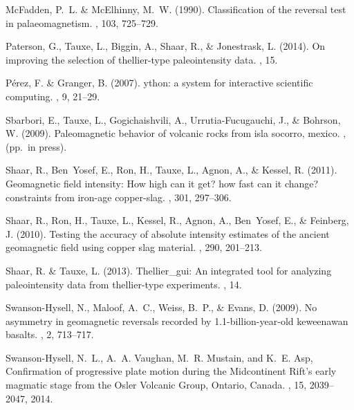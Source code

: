 \documentclass[11pt]{book}
\begin{document}
{{{{\begin{thebibliography}{}
McFadden, P.~L. \& McElhinny, M.~W. (1990).
\newblock Classification of the reversal test in palaeomagnetism.
, 103, 725--729.

Paterson, G., Tauxe, L., Biggin, A., Shaar, R., \& Jonestrask, L. (2014).
\newblock On improving the selection of thellier-type paleointensity data.
, 15.

P\'erez, F. \& Granger, B. (2007).
ython: a system for interactive scientific computing.
, 9, 21--29.

Sbarbori, E., Tauxe, L., Gogichaishvili, A., Urrutia-Fucugauchi, J., \&
  Bohrson, W. (2009).
\newblock Paleomagnetic behavior of volcanic rocks from isla socorro, mexico.
, (pp.\ in press).

Shaar, R., Ben~Yosef, E., Ron, H., Tauxe, L., Agnon, A., \& Kessel, R. (2011).
\newblock Geomagnetic field intensity: How high can it get? how fast can it
  change? constraints from iron-age copper-slag.
, 301, 297--306.

Shaar, R., Ron, H., Tauxe, L., Kessel, R., Agnon, A., Ben~Yosef, E., \&
  Feinberg, J. (2010).
\newblock Testing the accuracy of absolute intensity estimates of the ancient
  geomagnetic field using copper slag material.
, 290, 201--213.

Shaar, R. \& Tauxe, L. (2013).
\newblock Thellier\_gui: An integrated tool for analyzing paleointensity data
  from thellier-type experiments.
, 14.

Swanson-Hysell, N., Maloof, A.~C., Weiss, B.~P., \& Evans, D. (2009).
\newblock No asymmetry in geomagnetic reversals recorded by
  1.1-billion-year-old keweenawan basalts.
, 2, 713--717.

Swanson-Hysell, N.~L., A.~A. Vaughan, M.~R. Mustain, and K.~E. Asp,
\newblock Confirmation of progressive plate motion during the Midcontinent Rift's early
  magmatic stage from the Osler Volcanic Group, Ontario, Canada.
  , 15, 2039--2047, 2014.


\end{thebibliography}}}}}
\end{document}
